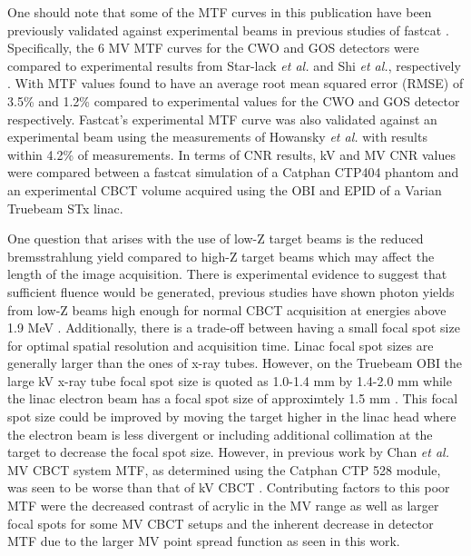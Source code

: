 One should note that some of the MTF curves in this publication have been previously validated against experimental beams in previous studies of fastcat \cite{OConnell2021FastCAT:Simulation,OConnell2021ExperimentalSimulator}. Specifically, the 6 MV MTF curves for the CWO and GOS detectors were compared to experimental results from Star-lack \textit{et al.} and Shi \textit{et al.}, respectively \cite{Star-Lack2015AImaging,Shi2018APerformance}. With MTF values found to have an average root mean squared error (RMSE) of 3.5\% and 1.2\% compared to experimental values for the CWO and GOS detector respectively. Fastcat's experimental MTF curve was also validated against an experimental beam using the measurements of Howansky \textit{et al.} \cite{Howansky2017DirectImaging} with results within 4.2\% of measurements. In terms of CNR results, kV and MV CNR values were compared between a fastcat simulation of a Catphan CTP404 phantom and an experimental CBCT volume acquired using the OBI and EPID of a Varian Truebeam STx linac.

One question that arises with the use of low-Z target beams is the reduced bremsstrahlung yield compared to high-Z target beams which may affect the length of the image acquisition. There is experimental evidence to suggest that sufficient fluence would be generated, previous studies have shown photon yields from low-Z beams high enough for normal CBCT acquisition at energies above 1.9 MeV \cite{Parsons2012BeamTargets}. Additionally, there is a trade-off between having a small focal spot size for optimal spatial resolution and acquisition time. Linac focal spot sizes are generally larger than the ones of x-ray tubes. However, on the Truebeam OBI the large kV x-ray tube focal spot size is quoted as 1.0-1.4 mm by 1.4-2.0 mm while the linac electron beam has a focal spot size of approximtely 1.5 mm \cite{Lopez-Sanchez2019AnParameters}. This focal spot size could be improved by moving the target higher in the linac head where the electron beam is less divergent or including additional collimation at the target to decrease the focal spot size. However, in previous work by Chan \textit{et al.} MV CBCT system MTF, as determined using the Catphan CTP 528 module, was seen to be worse than that of kV CBCT \cite{Chan2011EvaluationSystems}. Contributing factors to this poor MTF were the decreased contrast of acrylic in the MV range as well as larger focal spots for some MV CBCT setups and the inherent decrease in detector MTF due to the larger MV point spread function as seen in this work.

